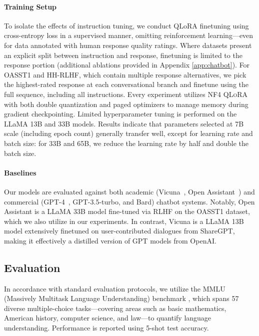 \paragraph{Training Setup} To isolate the effects of instruction tuning, we conduct QLoRA finetuning using cross-entropy loss in a supervised manner, omitting reinforcement learning—even for data annotated with human response quality ratings. Where datasets present an explicit split between instruction and response, finetuning is limited to the response portion (additional ablations provided in Appendix \ref{app:chatbot}). For OASST1 and HH-RLHF, which contain multiple response alternatives, we pick the highest-rated response at each conversational branch and finetune using the full sequence, including all instructions. Every experiment utilizes NF4 \textsc{QLoRA} with both double quantization and paged optimizers to manage memory during gradient checkpointing. Limited hyperparameter tuning is performed on the LLaMA 13B and 33B models. Results indicate that parameters selected at 7B scale (including epoch count) generally transfer well, except for learning rate and batch size: for 33B and 65B, we reduce the learning rate by half and double the batch size.

\paragraph{Baselines} Our models are evaluated against both academic (Vicuna~\citep{vicuna2023}, Open Assistant~\citep{kopf2023openassistant}) and commercial (GPT-4~\citep{openai2023gpt}, GPT-3.5-turbo, and Bard) chatbot systems. Notably, Open Assistant is a LLaMA 33B model fine-tuned via RLHF on the OASST1 dataset, which we also utilize in our experiments. In contrast, Vicuna is a LLaMA 13B model extensively finetuned on user-contributed dialogues from ShareGPT, making it effectively a distilled version of GPT models from OpenAI.

\subsection{Evaluation}

In accordance with standard evaluation protocols, we utilize the MMLU (Massively Multitask Language Understanding) benchmark \citep{hendrycksmeasuring}, which spans 57 diverse multiple-choice tasks—covering areas such as basic mathematics, American history, computer science, and law—to quantify language understanding. Performance is reported using 5-shot test accuracy.

